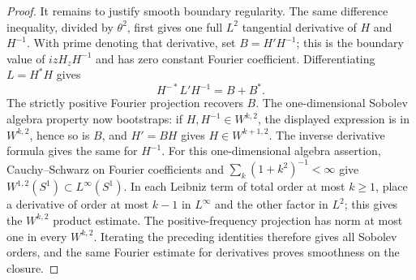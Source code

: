 \begin{proof}
It remains to justify smooth boundary regularity.  The same difference
inequality, divided by $\theta^2$, first gives one full $L^2$
tangential derivative of $H$ and $H^{-1}$.  With prime denoting that
derivative, set $B=H'H^{-1}$; this is the boundary value of
$izH_zH^{-1}$ and has zero constant Fourier coefficient.  Differentiating
$L=H^*H$ gives
\[
 H^{-*}L'H^{-1}=B+B^*.
\]
The strictly positive Fourier projection recovers $B$.  The
one-dimensional Sobolev algebra property now bootstraps: if
$H,H^{-1}\in W^{k,2}$, the displayed expression is in $W^{k,2}$,
hence so is $B$, and $H'=BH$ gives $H\in W^{k+1,2}$.
The inverse derivative formula gives the same for $H^{-1}$.
For this one-dimensional algebra assertion, Cauchy--Schwarz on
Fourier coefficients and $\sum_k(1+k^2)^{-1}<\infty$ give
$W^{1,2}(S^1)\subset L^\infty(S^1)$.  In each Leibniz term of total
order at most $k\ge1$, place a derivative of order at most $k-1$
in $L^\infty$ and the other factor in $L^2$; this gives the
$W^{k,2}$ product estimate.  The positive-frequency projection has
norm at most one in every $W^{k,2}$.  Iterating the preceding
identities therefore gives all Sobolev orders, and the same Fourier
estimate for derivatives proves smoothness on the closure.
\end{proof}

